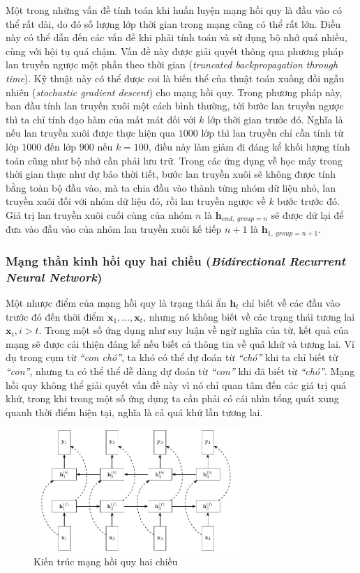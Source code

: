 Một trong những vấn đề tính toán khi huấn luyện mạng hồi quy là đầu vào có thể rất dài, do đó số lượng lớp thời gian trong mạng cũng có thể rất lớn. Điều này có thể dẫn đến các vấn đề khi phải tính toán và sử dụng bộ nhớ quá nhiều, cùng với hội tụ quá chậm. Vấn đề này được giải quyết thông qua phương pháp lan truyền ngược một phần theo thời gian (\textit{truncated backpropagation through time}). Kỹ thuật này có thể được coi là biến thể của thuật toán xuống đồi ngẫu nhiên (\textit{stochastic gradient descent}) cho mạng hồi quy. Trong phương pháp này, ban đầu tính lan truyền xuôi một cách bình thường, tới bước lan truyền ngược thì ta chỉ tính đạo hàm của mất mát đối với $k$ lớp thời gian trước đó. Nghĩa là nếu lan truyền xuôi được thực hiện qua $1000$ lớp thì lan truyền chỉ cần tính từ lớp $1000$ đến lớp $900$ nếu $k=100$, điều này làm giảm đi đáng kể khối lượng tính toán cũng như bộ nhớ cần phải lưu trữ. Trong các ứng dụng về học máy trong thời gian thực như dự báo thời tiết, bước lan truyền xuôi sẽ không được tính bằng toàn bộ đầu vào, mà ta chia đầu vào thành từng nhóm dữ liệu nhỏ, lan truyền xuôi đối với nhóm dữ liệu đó, rồi lan truyền ngược về $k$ bước trước đó. Giá trị lan truyền xuôi cuối cùng của nhóm $n$ là $\mathbf h_{end,\ group=n}$ sẽ được dữ lại để đưa vào đầu vào của nhóm lan truyền xuôi kế tiếp $n+1$ là $\mathbf h_{1,\ group=n+1}$. \cite{Aggarwal2023}

\subsubsection{Mạng thần kinh hồi quy hai chiều (\textit{Bidirectional Recurrent Neural Network})}
Một nhược điểm của mạng hồi quy là trạng thái ẩn $\mathbf h_t$ chỉ biết về các đầu vào trước đó đến thời điểm $\mathbf x_1,\dots,\mathbf x_t$, nhưng nó không biết về các trạng thái tương lai $\mathbf x_i,i>t$. Trong một số ứng dụng như suy luận về ngữ nghĩa của từ, kết quả của mạng sẽ được cải thiện đáng kể nếu biết cả thông tin về quá khứ và tương lai. Ví dụ trong cụm từ \textit{``con chó''}, ta khó có thể dự đoán từ \textit{``chó''} khi ta chỉ biết từ \textit{``con''}, nhưng ta có thể thể dễ dàng dự đoán từ \textit{``con''} khi đã biết từ \textit{``chó''}. Mạng hồi quy không thể giải quyết vấn đề này vì nó chỉ quan tâm đến các giá trị quá khứ, trong khi trong một số ứng dụng ta cần phải có cái nhìn tổng quát xung quanh thời điểm hiện tại, nghĩa là cả quá khứ lẫn tương lai.
\begin{figure}[htb]
    \centering
    \includegraphics[width=0.7\textwidth]{tikz_image/rnn_bidirectional_architecture.pdf}
    \caption{Kiến trúc mạng hồi quy hai chiều}
    \label{figure:rnn-bidirectional-architecture}
\end{figure}

